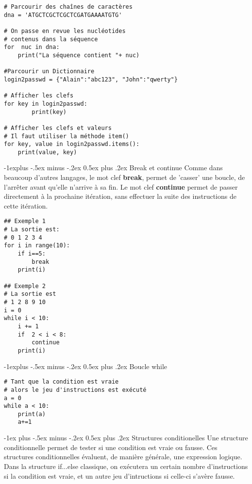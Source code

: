 \documentclass[10pt,landscape]{article}
\makeatletter
\renewcommand{\section}{\@startsection{section}{1}{0mm}%
                                {-1ex plus -.5ex minus -.2ex}%
                                {0.5ex plus .2ex}%
                                {\normalfont\large\bfseries}}
\renewcommand{\subsection}{\@startsection{subsection}{2}{0mm}%
                                {-1explus -.5ex minus -.2ex}%
                                {0.5ex plus .2ex}%
                                {\normalfont\normalsize\bfseries}}
\makeatother
\begin{document}
\begin{multicols}{3}
\begin{lstlisting}
# Parcourir des chaînes de caractères
dna = 'ATGCTCGCTCGCTCGATGAAAATGTG'

# On passe en revue les nucléotides
# contenus dans la séquence
for  nuc in dna:
	print("La séquence contient "+ nuc)

#Parcourir un Dictionnaire
login2passwd = {"Alain":"abc123", "John":"qwerty"} 

# Afficher les clefs
for key in login2passwd:
        print(key)

# Afficher les clefs et valeurs 
# Il faut utiliser la méthode item()
for key, value in login2passwd.items():
	print(value, key)
\end{lstlisting}

\subsection{Break et continue}
Comme dans beaucoup d'autres langages, le mot clef \textbf{break}, permet de 'casser' une boucle, de l'arrêter avant qu'elle n'arrive à sa fin. Le mot clef \textbf{continue} permet de passer directement à la prochaine itération, sans effectuer la suite des instructions de cette itération.

\begin{lstlisting}
## Exemple 1
# La sortie est:
# 0 1 2 3 4
for i in range(10):
	if i==5:
		break
	print(i)

## Exemple 2
# La sortie est 
# 1 2 8 9 10
i = 0
while i < 10:
	i += 1
	if  2 < i < 8:
		continue
	print(i)
\end{lstlisting}

\subsection{Boucle while}
\begin{lstlisting}
# Tant que la condition est vraie
# alors le jeu d'instructions est exécuté
a = 0
while a < 10:
    print(a)
    a+=1
\end{lstlisting}



\section{Structures conditionelles}
Une structure conditionnelle permet de tester si une condition est vraie ou fausse. Ces structures conditionnelles évaluent, de manière générale, une expression logique. Dans la structure if...else classique, on exécutera un certain nombre d'instructions si la condition est vraie, et un autre jeu d'intructions si celle-ci s'avère fausse.


\end{multicols}
\end{document}
